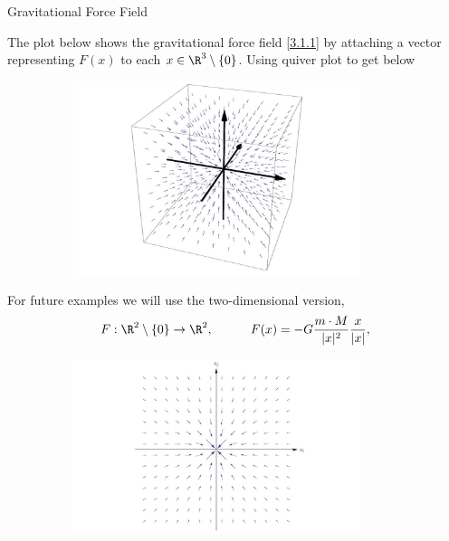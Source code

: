 \documentclass[smaller,hyperref={CJKbookmarks=true}]{beamer}
\begin{document}
\begin{frame}{Gravitational Force Field}
\begin{spacing}{1}
The plot below shows the gravitational force field \eqref{3.1.1} by attaching a vector
representing $F(x)$ to each $x\in\R^3\setminus\{0\}$.
{\tiny{Using quiver plot to get below}}
\begin{figure}
  \centering
  \includegraphics[width=0.9\textwidth,height=160pt]{61.jpg}

\end{figure}
\newpage
For future examples we will use the two-dimensional version,
\begin{equation}\label{3.1.2}
  F:\R^2\setminus\{0\}\to\R^2,\qquad\quad
  F(x)=-G\frac{m\cdot M}{|x|^2}\frac{x}{|x|},
\end{equation}
\vspace*{-14pt}
\begin{figure}
  \centering
  \includegraphics[width=0.9\textwidth,height=145pt]{62.jpg}

\end{figure}
\end{spacing}
\end{frame}
\end{document}

